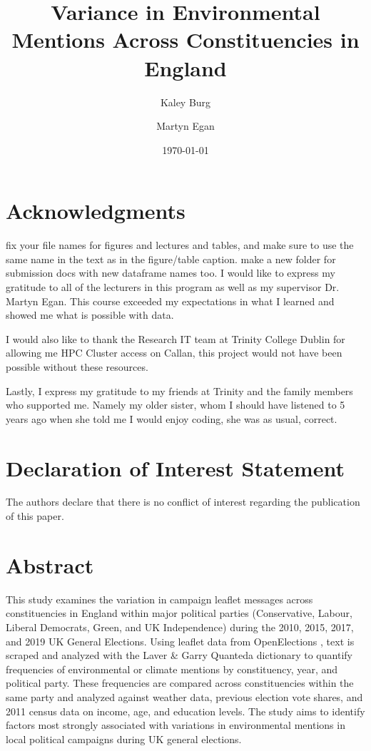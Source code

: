 \documentclass[preprint]{elsarticle} %
\title{Variance in Environmental Mentions Across Constituencies in England}
\author[1]{Kaley Burg\texorpdfstring{\fnref{fn1}}{}}
\author[2]{Martyn Egan\texorpdfstring{\corref{cor1}}{}}
\date{\today} %
\begin{document}
\maketitle %

\section*{Acknowledgments}


\large{fix your file names for figures and lectures and tables, and make sure to use the same name in the text as in the figure/table caption. make a new folder for submission docs with new dataframe names too.}	
\noindent			
I would like to express my gratitude to all of the lecturers in this program as well as my supervisor Dr. Martyn Egan. This course exceeded my expectations in what I learned and showed me what is possible with data.
			\vspace{0.5cm}

\noindent		
I would also like to thank the Research IT team at Trinity College Dublin for allowing me HPC Cluster access on Callan, this project would not have been possible without these resources.

			\vspace{0.5cm}
\noindent
Lastly, I express my gratitude to my friends at Trinity and the family members who supported me. Namely my older sister, whom I should have listened to 5 years ago when she told me I would enjoy coding, she was as usual, correct.

\section*{Declaration of Interest Statement}

\noindent
The authors declare that there is no conflict of interest regarding the publication of this paper.

\newpage
\section{Abstract}
\noindent
This study examines the variation in campaign leaflet messages across constituencies in England within major political parties (Conservative, Labour, Liberal Democrats, Green, and UK Independence) during the 2010, 2015, 2017, and 2019 UK General Elections. Using leaflet data from OpenElections \citep{milazzo2020openelections}, text is scraped and analyzed with the Laver \& Garry Quanteda dictionary \citep{laverEstimatingPolicyPositions2000} to quantify frequencies of environmental or climate mentions by constituency, year, and political party. These frequencies are compared across constituencies within the same party and analyzed against weather data, previous election vote shares, and 2011 census data on income, age, and education levels. The study aims to identify factors most strongly associated with variations in environmental mentions in local political campaigns during UK general elections.
\end{document}
